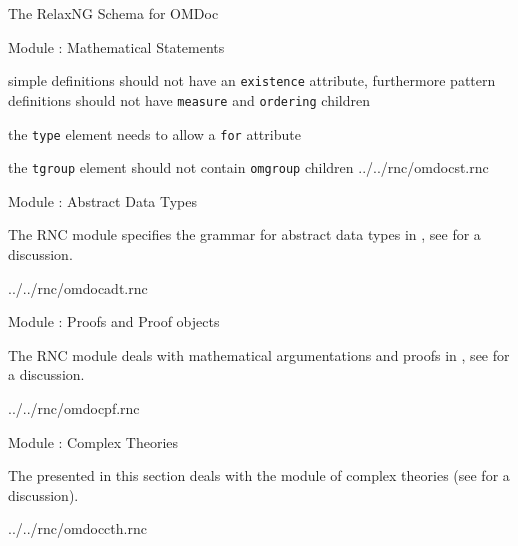\begin{tchapter}[id=rnc]{The RelaxNG Schema for OMDoc}
\begin{tsection}[id=rnc:st]{Module {}: Mathematical Statements}
\begin{erratum}[reported-by=Christoph Lange,date=2010-08-10]{simple definitions should not
    have an {\tt{existence}} attribute, furthermore pattern definitions should not have
    {\texttt{measure}} and {\texttt{ordering}} children}
\begin{erratum}[reported-by=Michael Kohlhase,date=2009-04-19]{the 
    {\tt{type}} element needs to allow a {\tt{for}} attribute}
\begin{erratum}[reported-by=Christoph Lange,date=2007-07-02]{the {\texttt{tgroup}} element
  should not contain {\texttt{omgroup}} children}
 {../../rnc/omdocst.rnc}
\end{erratum}
\end{erratum}
\end{erratum}
\end{tsection}

\begin{tsection}[id=rnc:adt]{Module {}: Abstract Data Types}

The RNC module {} specifies the grammar for abstract data types in 
{\omdoc}, see {} for a discussion.


{../../rnc/omdocadt.rnc}
\end{tsection}

\begin{tsection}[id=rnc:proof]{Module {}: Proofs and Proof objects}

The RNC module {} deals with mathematical argumentations and proofs
in {\omdoc}, see {} for a discussion.


{../../rnc/omdocpf.rnc}
\end{tsection}

\begin{tsection}[id=rnc:cth]{Module {}: Complex Theories}

  The {} presented in this section deals with the module
  {} of complex theories (see {} for a discussion).

 {../../rnc/omdoccth.rnc}
\end{tsection}


\end{tchapter}
